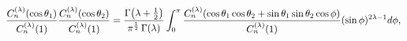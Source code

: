 \[\frac{\mathop{C^{(\lambda)}_{n}\/}\nolimits\!\left(\mathop{\cos\/}\nolimits%
\theta_{1}\right)}{\mathop{C^{(\lambda)}_{n}\/}\nolimits\!\left(1\right)}\frac%
{\mathop{C^{(\lambda)}_{n}\/}\nolimits\!\left(\mathop{\cos\/}\nolimits\theta_{%
2}\right)}{\mathop{C^{(\lambda)}_{n}\/}\nolimits\!\left(1\right)}=\frac{%
\mathop{\Gamma\/}\nolimits\!\left(\lambda+\frac{1}{2}\right)}{\pi^{\frac{1}{2}%
}\mathop{\Gamma\/}\nolimits\!\left(\lambda\right)}\*\int_{0}^{\pi}\frac{%
\mathop{C^{(\lambda)}_{n}\/}\nolimits\!\left(\mathop{\cos\/}\nolimits\theta_{1%
}\mathop{\cos\/}\nolimits\theta_{2}+\mathop{\sin\/}\nolimits\theta_{1}\mathop{%
\sin\/}\nolimits\theta_{2}\mathop{\cos\/}\nolimits\phi\right)}{\mathop{C^{(%
\lambda)}_{n}\/}\nolimits\!\left(1\right)}(\mathop{\sin\/}\nolimits\phi)^{2%
\lambda-1}d\phi,\]